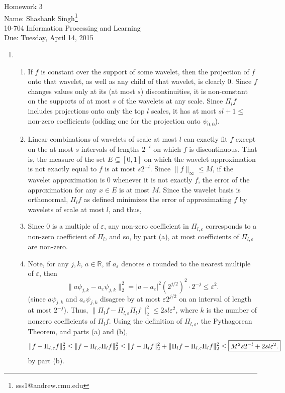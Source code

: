 \documentclass[11pt]{article}
\makeatletter
\newcommand{\myname}{Shashank Singh\footnote{sss1@andrew.cmu.edu}}
\newcommand{\myclass}{10-704 Information Processing and Learning}
\newcommand{\myhwnum}{3}
\newcommand{\duedate}{Tuesday, April 14, 2015}
\newcommand{\R}{\mathbb{R}} %
\newcommand{\e}{\varepsilon} %
\makeatother
\begin{document}
\thispagestyle{plain}

{\Large Homework \myhwnum} \\
Name: \myname \\
\myclass \\
Due: \duedate

\begin{enumerate}
\item
\begin{enumerate}
\item If $f$ is constant over the support of some wavelet, then the projection
of $f$ onto that wavelet, as well as any child of that wavelet, is clearly $0$.
Since $f$ changes values only at its (at most $s$) discontinuities, it is
non-constant on the supports of at most $s$ of the wavelets at any scale. Since
$\Pi_l f$ includes projections onto only the top $l$ scales, it has at most
$sl + 1 \leq $  non-zero coefficients (adding one for the projection
onto $\psi_{0,0}$).

\item Linear combinations of wavelets of scale at most $l$ can exactly fit $f$
except on the at most $s$ intervals of lengths $2^{-l}$ on which $f$ is
discontinuous. That is, the measure of the set $E \subseteq [0,1] $ on which
the wavelet approximation is not exactly equal to $f$ is at most $s 2^{-l}$.
Since $\|f\|_\infty \leq M$, if the wavelet approximation is $0$ whenever it is
not exactly $f$, the error of the approximation for any $x \in E$ is at most
$M$. Since the wavelet basis is orthonormal, $\Pi_l f$ as defined minimizes the
error of approximating $f$ by wavelets of scale at most $l$, and thus,

\item Since $0$ is a multiple of $\e$, any non-zero coefficient in
$\Pi_{l,\e}$ corresponds to a non-zero coefficient of $\Pi_l$, and so, by part
(a), at most  coefficients of $\Pi_{l,\e}$ are non-zero.

\item Note, for any $j,k$, $a \in \R$, if $a_\e$ denotes $a$ rounded to the
nearest multiple of $\e$, then
\[\|a\psi_{j,k} - a_\e\psi_{j,k}\|_2^2 = |a - a_\e|^2 (2^{j/2})^2 \cdot 2^{-j}
    \leq \e^2.\]
(since $a\psi_{j,k}$ and $a_\e\psi_{j,k}$ disagree by at most $\e2^{j/2}$ on an
interval of length at most $2^{-j}$). Thus,
$\|\Pi_l f - \Pi_{l,\e} \Pi_l f\|_2^2 \leq 2sl \e^2$, where $k$ is the number of
nonzero coefficients of $\Pi_l f$. Using the definition of $\Pi_{l,\e}$,
the Pythagorean Theorem, and parts (a) and (b),
\[\|f - \Pi_{l,\e}f\|_2^2
    \leq \|f - \Pi_{l,e} \Pi_l f\|_2^2
    \leq \|f - \Pi_l f\|_2^2
    + \|\Pi_l f - \Pi_{l,e} \Pi_l f\|_2^2
    \leq \mbox{\fbox{$M^2s2^{-l} + 2sl\e^2$.}}
\]
by part (b).


\end{enumerate}
\end{enumerate}
\end{document}
